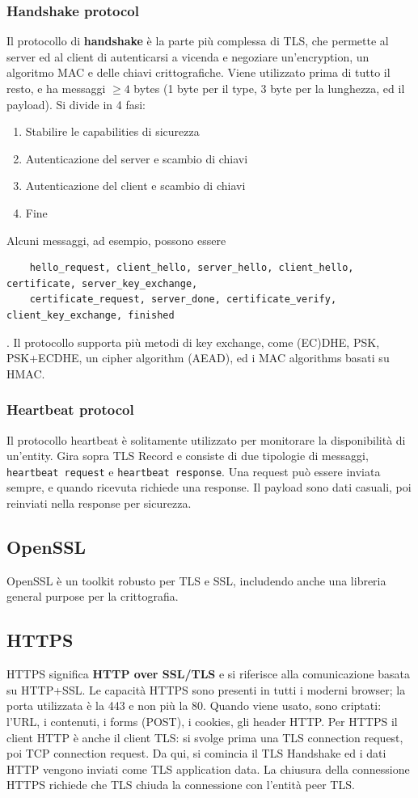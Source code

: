 \documentclass[11pt]{article}
\begin{document}
\subsubsection{Handshake protocol}
Il protocollo di \textbf{handshake} è la parte più complessa di TLS, che permette al server ed al client di autenticarsi a vicenda e negoziare un'encryption, un algoritmo MAC e delle chiavi crittografiche. Viene utilizzato prima di tutto il resto, e ha messaggi $\ge 4$ bytes (1 byte per il type, 3 byte per la lunghezza, ed il payload). Si divide in 4 fasi:
\begin{enumerate}
    \item Stabilire le capabilities di sicurezza
    \item Autenticazione del server e scambio di chiavi 
    \item Autenticazione del client e scambio di chiavi 
    \item Fine
\end{enumerate}
Alcuni messaggi, ad esempio, possono essere \begin{verbatim}
    hello_request, client_hello, server_hello, client_hello, certificate, server_key_exchange,
    certificate_request, server_done, certificate_verify, client_key_exchange, finished
\end{verbatim}. 
Il protocollo supporta più metodi di key exchange, come (EC)DHE, PSK, PSK+ECDHE, un cipher algorithm (AEAD), ed i MAC algorithms basati su HMAC. 
\subsubsection{Heartbeat protocol}
Il protocollo heartbeat è solitamente utilizzato per monitorare la disponibilità di un'entity. Gira sopra TLS Record e consiste di due tipologie di messaggi, \verb|heartbeat request| e \verb|heartbeat response|. Una request può essere inviata sempre, e quando ricevuta richiede una response. Il payload sono dati casuali, poi reinviati nella response per sicurezza.
\subsection{OpenSSL}
OpenSSL è un toolkit robusto per TLS e SSL, includendo anche una libreria general purpose per la crittografia.
\subsection{HTTPS} 
HTTPS significa \textbf{HTTP over SSL/TLS} e si riferisce alla comunicazione basata su HTTP+SSL. Le capacità HTTPS sono presenti in tutti i moderni browser; la porta utilizzata è la 443 e non più la 80. Quando viene usato, sono criptati: l'URL, i contenuti, i forms (POST), i cookies, gli header HTTP. Per HTTPS il client HTTP è anche il client TLS: si svolge prima una TLS connection request, poi TCP connection request. Da qui, si comincia il TLS Handshake ed i dati HTTP vengono inviati come TLS application data. La chiusura della connessione HTTPS richiede che TLS chiuda la connessione con l'entità peer TLS. 
\end{document}

